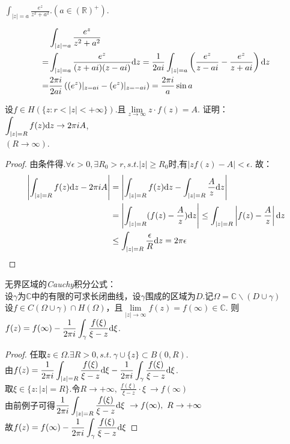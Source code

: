 \begin{eg}
	$\displaystyle{\int_{|z|=a}\frac{e^z}{z^2+a^2}.(a\in\mathbb{(R)^+})}$.
\end{eg}
\begin{jie}{}
	\begin{align*}
	&\int_{|z|=a}\frac{e^z}{z^2+a^2}\\
	=&\int_{|z|=a}\frac{e^z}{(z+ai)(z-ai)}\mathrm{d}z=\frac{1}{2ai}\int_{|z|=a}\left(\frac{e^z}{z-ai}-\frac{e^z}{z+ai}\right)\mathrm{d}z\\
	=&\frac{2\pi i}{2ai}\left((e^z)|_{z=ai}-(e^z)|_{z=-ai}\right)=\frac{2\pi i}{a}\sin a
	\end{align*}
\end{jie}

\begin{eg}
	设$f\in H(\{z:r<|z|<+\infty\})$.且$\lim\limits_{z\rightarrow\infty}z\cdot f(z)=A$.
	证明：$\displaystyle{\int_{|z|=R}f(z)\mathrm{d}z\rightarrow 2\pi iA}$,\\$(R\rightarrow\infty)$.
\end{eg}
\begin{proof}
	由条件得.$\forall\epsilon>0,\exists R_0>r,s.t.|z|\geq R_0$时,有$|zf(z)-A|<\epsilon$.
	故：
	\begin{align*}
	\left|\int_{|z|=R}f(z)\mathrm{d}z-2\pi iA\right|
	&=\left|\int_{|z|=R}f(z)\mathrm{d}z-\int_{|z|=R}\frac{A}{z}\mathrm{d}z\right|\\
	&=\left|\int_{|z|=R}(f(z)-\frac{A}{z})\mathrm{d}z\right|\leq\int_{|z|=R}\left|f(z)-\frac{A}{z}\right|\mathrm{d}z\\
	&\leq\int_{|z|=R}\frac{\epsilon}{R}\mathrm{d}z=2\pi\epsilon
	\end{align*}
\end{proof}
\begin{eg}
	无界区域的\emph{Cauchy}积分公式：\\
	设$\gamma$为$\mathbb{C}$中的有限的可求长闭曲线，设$\gamma$围成的区域为$D$.记$\Omega=\mathbb{C}\backslash(D\cup \gamma)$\\
	设$f\in C(\Omega\cup \gamma)\cap H(\Omega)$，且$\lim\limits_{|z|\rightarrow\infty}f(z)=f(\infty)\in\mathbb{C}$.
	则$\displaystyle{f(z)=f(\infty)-\frac{1}{2\pi i}\int_{\gamma}\frac{f(\xi)}{\xi-z}\mathrm{d}\xi}$.
\end{eg}
\begin{proof}
	任取$\displaystyle{z\in\Omega.\exists R>0,s.t.\ \gamma\cup\{z\}\subset B(0,R)}$.\\
	由$\displaystyle{f(z)=\frac{1}{2\pi i}\int_{|z|=R}\frac{f(\xi)}{\xi-z}\mathrm{d}\xi-\frac{1}{2\pi i}\int_{\gamma}\frac{f(\xi)}{\xi-z}\mathrm{d}\xi}$.\\
	取$\displaystyle{\xi\in\{z:|z|=R\}}$.令$\displaystyle{R\rightarrow+\infty,\ \frac{f(\xi)}{\xi-z}\cdot\xi\ \rightarrow f(\infty)}$\\
	由前例子可得$\displaystyle{\frac{1}{2\pi i}\int_{|z|=R}\frac{f(\xi)}{\xi-z}\di{\xi}\ \rightarrow f(\infty),\ R\rightarrow+\infty}$\\
	故$\displaystyle{f(z)=f(\infty)-\frac{1}{2\pi i}\int_\gamma\frac{f(\xi)}{\xi-z}\mathrm{d}\xi}$
\end{proof}

